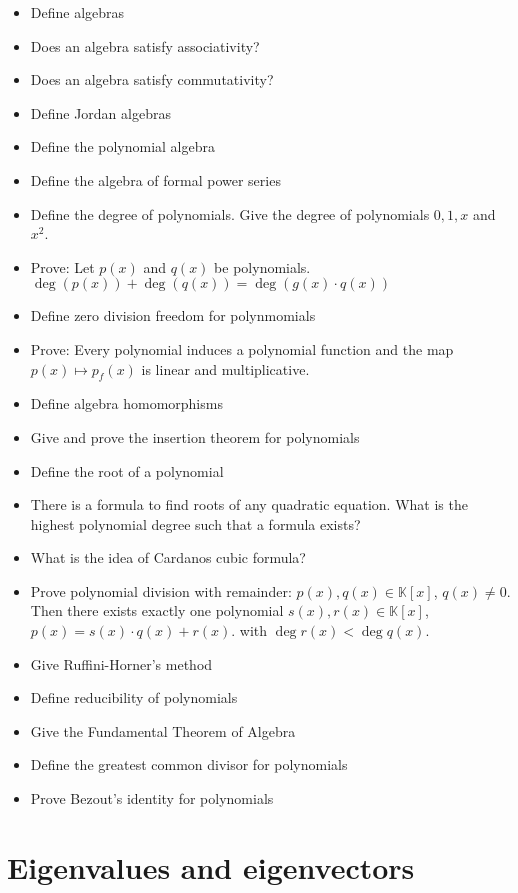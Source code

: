 \documentclass[a4paper]{article}
\begin{document}
\begin{itemize}
  \item Define algebras
  \item Does an algebra satisfy associativity?
  \item Does an algebra satisfy commutativity?
  \item Define Jordan algebras
  \item Define the polynomial algebra
  \item Define the algebra of formal power series
  \item Define the degree of polynomials. Give the degree of polynomials $0, 1, x$ and $x^2$.
  \item Prove: Let $p(x)$ and $q(x)$ be polynomials. $\deg(p(x)) + \deg(q(x)) = \deg(g(x) \cdot q(x))$
  \item Define zero division freedom for polynmomials
  \item Prove: Every polynomial induces a polynomial function and the map $p(x) \mapsto p_f(x)$ is linear and multiplicative.
  \item Define algebra homomorphisms
  \item Give and prove the insertion theorem for polynomials
  \item Define the root of a polynomial
  \item There is a formula to find roots of any quadratic equation. What is the highest polynomial degree such that a formula exists?
  \item What is the idea of Cardanos cubic formula?
  \item Prove polynomial division with remainder: $p(x), q(x) \in \mathbb K[x]$, $q(x) \neq 0$. Then there exists exactly one polynomial $s(x), r(x) \in \mathbb K[x]$, $p(x) = s(x) \cdot q(x) + r(x)$.
  with $\deg{r(x)} < \deg{q(x)}$.
  \item Give Ruffini-Horner's method
  \item Define reducibility of polynomials
  \item Give the Fundamental Theorem of Algebra
  \item Define the greatest common divisor for polynomials
  \item Prove Bezout's identity for polynomials
\end{itemize}

\section{Eigenvalues and eigenvectors}
\end{document}
